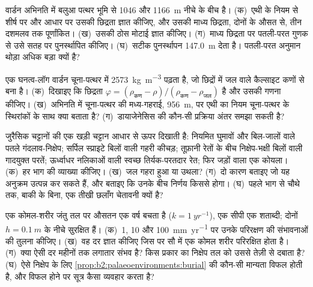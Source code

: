 \begin{exercise}[$\star\star$]\label{exo:b2:palaeoenvironments:7}
वार्डन अभिनति में बलुआ पत्थर भूमि से 1046 और \qty{1166}{m} नीचे के बीच है। (क)~एथी के नियम से
शीर्ष पर और आधार पर उसकी छिद्रता ज्ञात कीजिए, और उसकी माध्य छिद्रता, दोनों के औसत से,
तीन दशमलव तक पूर्णांकित। (ख)~उसकी ठोस मोटाई ज्ञात कीजिए। (ग)~माध्य छिद्रता पर पतली-परत गुणक से उसे
सतह पर पुनर्स्थापित कीजिए। (घ)~सटीक पुनर्स्थापन
\qty{147.0}{m} देता है। पतली-परत अनुमान थोड़ा अधिक बड़ा क्यों है?
\end{exercise}

\begin{exercise}[$\star\star$]\label{exo:b2:palaeoenvironments:8}
एक घनत्व-लॉग वार्डन चूना-पत्थर में \qty{2573}{kg.m^{-3}} पढ़ता है, जो छिद्रों में जल वाले कैल्साइट कणों
से बना है। (क)~दिखाइए कि छिद्रता $\varphi = (\rho_{\text{कण}} -
\rho)/(\rho_{\text{कण}} - \rho_{\text{जल}})$ है और उसकी गणना कीजिए। (ख)~अभिनति में
चूना-पत्थर की मध्य-गहराई, \qty{956}{m}, पर एथी का नियम चूना-पत्थर के स्थिरांकों के साथ क्या बताता है?
(ग)~डायाजेनेसिस की कौन-सी प्रक्रिया अंतर समझा सकती है?
\end{exercise}

\begin{exercise}[$\star\star$]\label{exo:b2:palaeoenvironments:9}
जुरैसिक चट्टानों की एक खड़ी चट्टान आधार से ऊपर दिखाती है: नियमित घुमावों और बिल-जालों वाले पतले
गंदलाव-निक्षेप; सर्पिल स्प्राइटे बिलों वाली गहरी कीचड़; तूफ़ानी रेतों के बीच निक्षेप-भक्षी बिलों वाली
गादयुक्त परतें; ऊर्ध्वाधर नलिकाओं वाली
स्वच्छ तिर्यक-परतदार रेत; फिर जड़ों वाला एक कोयला। (क)~हर भाग की व्याख्या कीजिए। (ख)~जल गहरा हुआ या
उथला? (ग)~दो कारण बताइए जो यह अनुक्रम उत्पन्न कर सकते हैं, और बताइए कि उनके बीच निर्णय
किससे होगा। (घ)~पहले भाग से चौथे तक, बाकी के बिना, एक तीखी छलाँग
चेतावनी क्यों है?
\end{exercise}

\begin{exercise}[$\star\star\star$]\label{exo:b2:palaeoenvironments:10}
एक कोमल-शरीर जंतु तल पर औसतन एक वर्ष बचता है ($k = \qty{1}{yr^{-1}}$), एक
सीपी एक शताब्दी; दोनों $h = \qty{0.1}{m}$ के नीचे सुरक्षित हैं। (क)~1, 10 और \qty{100}{mm.yr^{-1}} पर
उनके परिरक्षण की संभावनाओं की तुलना कीजिए। (ख)~वह दर ज्ञात कीजिए जिस पर सौ में एक कोमल शरीर
परिरक्षित होता है। (ग)~क्या ऐसी दर महीनों तक लगातार संभव है? किस प्रकार का निक्षेप
तल को उससे तेज़ी से दबाता है? (घ)~ऐसे निक्षेप के लिए \cref{prop:b2:palaeoenvironments:burial} की कौन-सी
मान्यता विफल होती है, और विफल होने पर सूत्र कैसा व्यवहार करता है?
\end{exercise}

